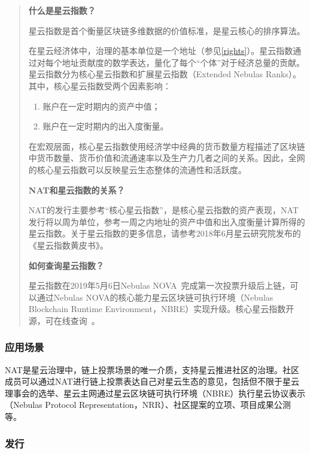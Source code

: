 \begin{quote}
	\textbf{什么是星云指数？}
		
	星云指数是首个衡量区块链多维数据的价值标准，是星云核心的排序算法。

	在星云经济体中，治理的基本单位是一个地址（参见\ref{rights}）。星云指数通过对每个地址贡献度的数学表达，量化了每个“个体”对于经济总量的贡献。星云指数分为核心星云指数和扩展星云指数（Extended Nebulas Ranks）。其中，核心星云指数受两个因素影响：

	\begin{enumerate}
		\item 账户在一定时期内的资产中值；
		\item 账户在一定时期内的出入度衡量。
	\end{enumerate}

	在宏观层面，核心星云指数使用经济学中经典的货币数量方程描述了区块链中货币数量、货币价值和流通速率以及生产力几者之间的关系。因此，全网的核心星云指数可以反映星云生态整体的流通性和活跃度。

	\vspace{2em}

	\textbf{NAT和星云指数的关系？}

	NAT的发行主要参考“核心星云指数”，是核心星云指数的资产表现，NAT发行将以周为单位，参考一周之内地址的资产中值和出入度衡量计算所得的星云指数。关于星云指数的更多信息，请参考2018年6月星云研究院发布的《星云指数黄皮书》。

	\vspace{2em}

	\textbf{如何查询星云指数？}

	星云指数在2019年5月6日Nebulas NOVA~\cite{nova}完成第一次投票升级后上链，可以通过Nebulas NOVA的核心能力星云区块链可执行环境（Nebulas Blockchain Runtime Environment，NBRE）实现升级。核心星云指数开源，可在线查询~\cite{CheckNR}。

\end{quote}

\subsubsection{应用场景}

NAT是星云治理中，链上投票场景的唯一介质，支持星云推进社区的治理。社区成员可以通过NAT进行链上投票表达自己对星云生态的意见，包括但不限于星云理事会的选举、星云主网通过星云区块链可执行环境（NBRE）执行星云协议表示（Nebulas Protocol Representation，NRR）、社区提案的立项、项目成果公测等。

\subsubsection{发行}
	
